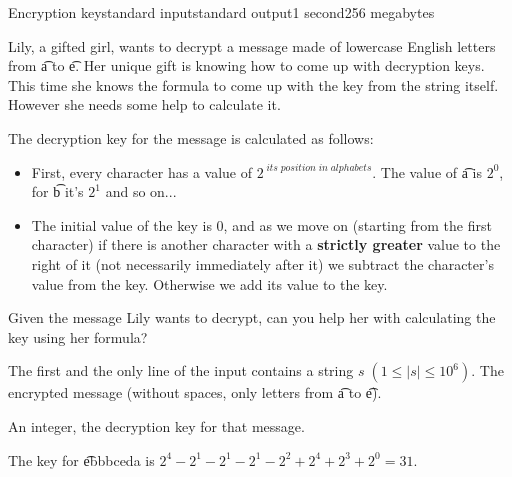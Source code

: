 \begin{problem}{Encryption key}{standard input}{standard output}{1 second}{256 megabytes}

Lily, a gifted girl, wants to decrypt a message made of lowercase English letters from \t{a} to \t{e}. Her unique gift is knowing how to come up with decryption keys. This time she knows the formula to come up with the key from the string itself. However she needs some help to calculate it.

The decryption key for the message is calculated as follows:

\begin{itemize}
\item First, every character has a value of $2^{\;its\;position\;in\;alphabets}$. The value of \t{a} is $2^0$, for \t{b} it's $2^1$ and so on...
\item The initial value of the key is $0$, and as we move on (starting from the first character) if there is another character with a \textbf{strictly greater} value to the right of it (not necessarily immediately after it) we subtract the character's value from the key. Otherwise we add its value to the key.
\end{itemize}

Given the message Lily wants to decrypt, can you help her with calculating the key using her formula?

\InputFile
The first and the only line of the input contains a string $s \; (1 \leq |s| \leq 10^6)$. The encrypted message (without spaces, only letters from \t{a} to \t{e}). 

\OutputFile
An integer, the decryption key for that message.

\Example

\begin{example}
%
\end{example}

\Note
The key for \t{ebbbceda} is $2^4 - 2^1 - 2^1 - 2^1 - 2^2 + 2^4 + 2^3 + 2^0 = 31$.

\end{problem}

